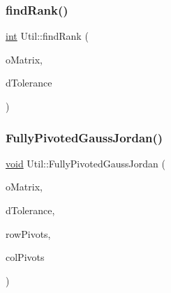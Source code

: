 \mbox{\label{class_l_i_b___l_a_1_1_util_a563218650851d8c02606f3e7beadb105}} 
\subsubsection{\texorpdfstring{find\+Rank()}{findRank()}}
{\footnotesize\ttfamily \hyperlink{lp__lib_8h_adeb9ec6400320e4923ac9d836d509ddb}{int} Util\+::find\+Rank (\begin{DoxyParamCaption}\item[{Double\+Matrix \&}]{o\+Matrix,  }\item[{double}]{d\+Tolerance }\end{DoxyParamCaption})\hspace{0.3cm}{\ttfamily [static]}}

\mbox{\label{class_l_i_b___l_a_1_1_util_af5eef89fa6d8db717be7b0a0079e67e3}} 
\subsubsection{\texorpdfstring{Fully\+Pivoted\+Gauss\+Jordan()}{FullyPivotedGaussJordan()}}
{\footnotesize\ttfamily \hyperlink{lp__lib_8h_ac7828c7b2b31d2e11af17bdb6289c5d9}{void} Util\+::\+Fully\+Pivoted\+Gauss\+Jordan (\begin{DoxyParamCaption}\item[{Double\+Matrix \&}]{o\+Matrix,  }\item[{double}]{d\+Tolerance,  }\item[{std\+::vector$<$ \hyperlink{lp__lib_8h_adeb9ec6400320e4923ac9d836d509ddb}{int} $>$ \&}]{row\+Pivots,  }\item[{std\+::vector$<$ \hyperlink{lp__lib_8h_adeb9ec6400320e4923ac9d836d509ddb}{int} $>$ \&}]{col\+Pivots }\end{DoxyParamCaption})\hspace{0.3cm}{\ttfamily [static]}}

\mbox{\label{class_l_i_b___l_a_1_1_util_aacf9ed799e3ffd8a1851b8561c9e9a98}} 
